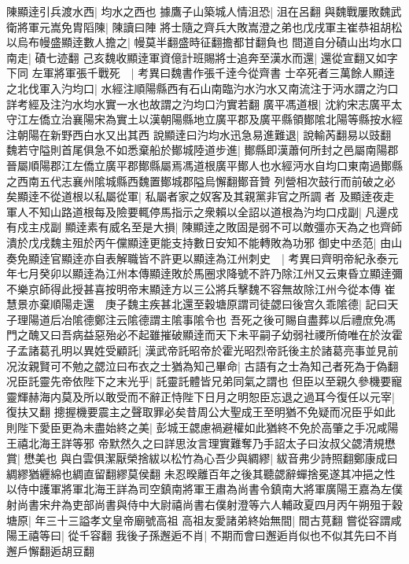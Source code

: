 陳顯逹引兵渡水西|{
	均水之西也}
據鷹子山築城人情沮恐|{
	沮在呂翻}
與魏戰屢敗魏武衛將軍元嵩免胄䧟陳|{
	陳讀曰陣}
將士隨之齊兵大敗嵩澄之弟也戊戌軍主崔恭祖胡松以烏布幔盛顯逹數人擔之|{
	幔莫半翻盛時征翻擔都甘翻負也}
間道自分磧山出均水口南走|{
	磧七迹翻}
己亥魏收顯逹軍資億計班賜將士追奔至漢水而還|{
	還從宣翻又如字下同}
左軍將軍張千戰死　|{
	考異曰魏書作張千逹今從齊書}
士卒死者三萬餘人顯逹之北伐軍入汋均口|{
	水經注順陽縣西有石山南臨汋水汋水又南流注于沔水謂之汋口詳考經及注汋水均水實一水也故謂之汋均口汋實若翻}
廣平馮道根|{
	沈約宋志廣平太守江左僑立治襄陽宋為實土以漢朝陽縣地立廣平郡及廣平縣領鄼隂北陽等縣按水經注朝陽在新野西白水又出其西}
說顯逹曰汋均水迅急易進難退|{
	說輸芮翻易以豉翻}
魏若守隘則首尾俱急不如悉棄船於鄼城陸道步進|{
	鄼縣即漢蕭何所封之邑屬南陽郡晉屬順陽郡江左僑立廣平郡鄼縣屬焉馮道根廣平鄼人也水經沔水自均口東南過鄼縣之西南五代志襄州隂城縣西魏置鄼城郡隘烏懈翻鄼音贊}
列營相次鼓行而前破之必矣顯逹不從道根以私屬從軍|{
	私屬者家之奴客及其親黨非官之所調者}
及顯逹夜走軍人不知山路道根每及險要輒停馬指示之衆賴以全詔以道根為汋均口戍副|{
	凡邊戍有戍主戍副}
顯逹素有威名至是大損|{
	陳顯逹之敗固是弱不可以敵彊亦天為之也齊師潰於戊戌魏主殂於丙午儻顯逹更能支持數日安知不能轉敗為功邪}
御史中丞范|{
	由山}
奏免顯逹官顯逹亦自表解職皆不許更以顯逹為江州刺史　|{
	考異曰齊明帝紀永泰元年七月癸卯以顯逹為江州本傳顯逹敗於馬圈求降號不許乃除江州又云東昏立顯逹彌不樂京師得此授甚喜按明帝末顯逹方以三公將兵擊魏不容無故除江州今從本傳}
崔慧景亦棄順陽走還　庚子魏主疾甚北還至穀塘原謂司徒勰曰後宫久乖隂德|{
	記曰天子理陽道后冶隂德鄭注云隂德謂主隂事隂令也}
吾死之後可賜自盡葬以后禮庶免馮門之醜又曰吾病益惡殆必不起雖摧破顯逹而天下未平嗣子幼弱社禝所倚唯在於汝霍子孟諸葛孔明以異姓受顧託|{
	漢武帝託昭帝於霍光昭烈帝託後主於諸葛亮事並見前}
况汝親賢可不勉之勰泣曰布衣之士猶為知己畢命|{
	古語有之士為知己者死為于偽翻}
况臣託靈先帝依陛下之末光乎|{
	託靈託體皆兄弟同氣之謂也}
但臣以至親久參機要寵靈輝赫海内莫及所以敢受而不辭正恃陛下日月之明恕臣忘退之過耳今復任以元宰|{
	復扶又翻}
摠握機要震主之聲取罪必矣昔周公大聖成王至明猶不免疑而况臣乎如此則陛下愛臣更為未盡始終之美|{
	彭城王勰慮禍避權如此猶終不免於高肇之手况咸陽王禧北海王詳等邪}
帝默然久之曰詳思汝言理實難奪乃手詔太子曰汝叔父勰清規懋賞|{
	懋美也}
與白雲俱潔厭榮捨紱以松竹為心吾少與綢繆|{
	紱音弗少詩照翻鄭康成曰綢繆猶纒綿也綢直留翻繆莫侯翻}
未忍暌離百年之後其聽勰辭蟬捨冕遂其冲挹之性以侍中護軍將軍北海王詳為司空鎮南將軍王肅為尚書令鎮南大將軍廣陽王嘉為左僕射尚書宋弁為吏部尚書與侍中大尉禧尚書右僕射澄等六人輔政夏四月丙午朔殂于穀塘原|{
	年三十三謚孝文皇帝廟號高祖}
高祖友愛諸弟終始無間|{
	間古莧翻}
嘗從容謂咸陽王禧等曰|{
	從千容翻}
我後子孫邂逅不肖|{
	不期而會曰邂逅肖似也不似其先曰不肖邂戶懈翻逅胡豆翻}
